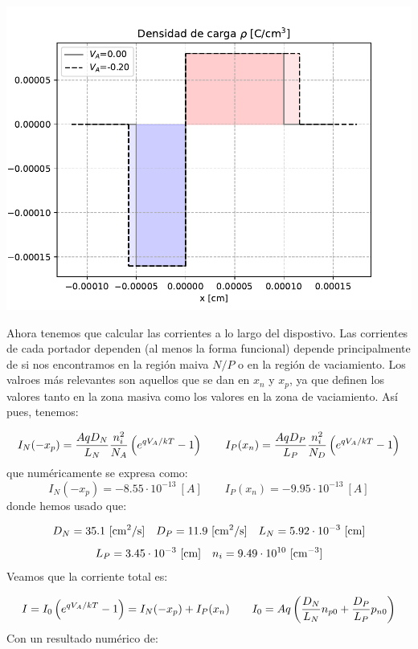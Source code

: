 \begin{enumerate}[label=\alph*)]
\begin{figure}[h!]
\begin{subfigure}{0.47\textwidth}
    \end{subfigure}
    \end{figure}
    \begin{center}
        \includegraphics[width=0.6\linewidth]{Cuerpo/Ch_03/03_06_rho.pdf}
    \end{center}   
    Ahora tenemos que calcular las corrientes a lo largo del dispostivo. Las corrientes de cada portador dependen (al menos la forma funcional) depende principalmente de si nos encontramos en la región maiva $N/P$ o en la región de vaciamiento. 
    Los valroes más relevantes son aquellos que se dan en $x_n$ y $x_p$, ya que definen los valores tanto en la zona masiva como los valores en la zona de vaciamiento. Así pues, tenemos:

    \begin{equation}
        I_N (-x_p) = \frac{AqD_N}{L_N}  \frac{n_i^2}{N_A} \left( e^{qV_A/kT}-1 \right) \qquad
        I_P (x_n) = \frac{AqD_P}{L_P} \frac{n_i^2}{N_D}  \left( e^{qV_A/kT}-1 \right)
    \end{equation}
    que numéricamente se expresa como:
    \begin{equation}
        I_N (-x_p) = -8.55\cdot10^{-13} \ [\unit{A}] \qquad 
        I_P (x_n) = -9.95 \cdot 10^{-13}\ [\unit{A}]
    \end{equation}
    donde hemos usado que:

    \begin{equation}
        D_N = 35.1 \ [\unit{cm^2/s}] \quad 
        D_P = 11.9 \ [\unit{cm^2/s}] \quad L_N = 5.92 \cdot 10^{-3} \ [\cm] \end{equation}
    \begin{equation}     
        L_P = 3.45 \cdot 10^{-3} \ [\cm]  \quad n_i = 9.49 \cdot 10^{10} \ [\cm^{-3}]
    \end{equation}
    Veamos que la corriente total es:    

    \begin{equation}
        I = I_0 \left( e^{qV_A/kT}-1 \right) = I_N (-x_p) + I_P (x_n) \qquad  I_0 =  A q \left( \frac{D_N}{L_N} n_{p0} + \frac{D_P}{L_P} p_{n0} \right)
    \end{equation}
    Con un resultado numérico de: 


\end{enumerate}
